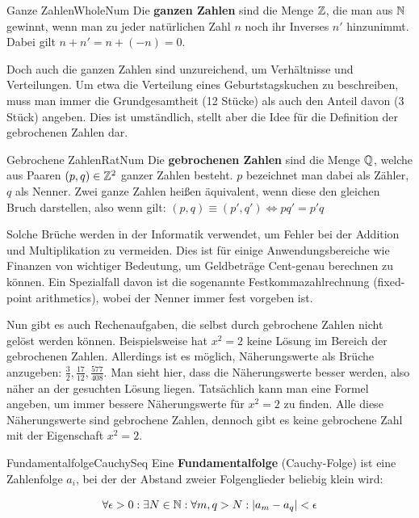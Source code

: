 \begin{definition}{Ganze Zahlen}{WholeNum}
	Die \textbf{ganzen Zahlen} sind die Menge $\mathbb{Z}$, die man aus $\mathbb{N}$ gewinnt, wenn man zu jeder natürlichen Zahl $n$ noch ihr Inverses $n'$ hinzunimmt. Dabei gilt $n+n' = n+(-n) = 0$.
\end{definition}

Doch auch die ganzen Zahlen sind unzureichend, um Verhältnisse und Verteilungen. Um etwa die Verteilung eines Geburtstagskuchen zu beschreiben, muss man immer die Grundgesamtheit (12 Stücke) als auch den Anteil
davon (3 Stück) angeben. Dies ist umständlich, stellt aber die Idee für die Definition der gebrochenen Zahlen dar.

\begin{definition}{Gebrochene Zahlen}{RatNum}
	Die \textbf{gebrochenen Zahlen} sind die Menge $\mathbb{Q}$, welche aus Paaren $(p,q) \in \mathbb{Z}^2$ ganzer Zahlen besteht. $p$ bezeichnet man dabei als Zähler, $q$ als Nenner. Zwei ganze Zahlen heißen äquivalent,  wenn
	diese den gleichen Bruch darstellen, also wenn gilt: $(p,q) \equiv (p',q') \iff pq'=p'q$
\end{definition}

Solche Brüche werden in der Informatik verwendet, um Fehler bei der Addition und Multiplikation zu vermeiden. Dies ist für einige Anwendungsbereiche wie Finanzen von wichtiger Bedeutung, um Geldbeträge
Cent-genau berechnen zu können. Ein Spezialfall davon ist die sogenannte Festkommazahlrechnung (fixed-point arithmetics), wobei der Nenner immer fest vorgeben ist.

Nun gibt es auch Rechenaufgaben, die selbst durch gebrochene Zahlen nicht gelöst werden können. Beispielsweise hat $x^2=2$ keine Lösung im Bereich der gebrochenen Zahlen. Allerdings ist es möglich,
Näherungswerte als Brüche anzugeben: $\frac{3}{2}, \frac{17}{12},\frac{577}{408}$. Man sieht hier, dass die Näherungswerte besser werden, also näher an der gesuchten Lösung liegen. Tatsächlich kann man
eine Formel angeben, um immer bessere Näherungswerte für $x^2=2$ zu finden. Alle diese Näherungswerte sind gebrochene Zahlen, dennoch gibt es keine gebrochene Zahl mit der Eigenschaft $x^2=2$.

\begin{definition}{Fundamentalfolge}{CauchySeq}
	Eine \textbf{Fundamentalfolge} (Cauchy-Folge) ist eine Zahlenfolge $a_i$, bei der der Abstand zweier Folgenglieder beliebig klein wird:

    \begin{equation}
        \forall \epsilon > 0: \exists N \in \mathbb{N}: \forall m,q>N: |a_m-a_q|<\epsilon
    \end{equation}
\end{definition}

